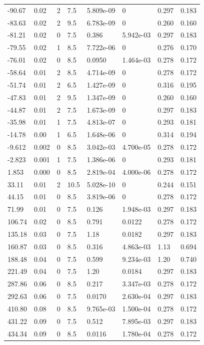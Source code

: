 \documentclass[preview]{standalone}
\begin{document}
{{\begin{tabular}{L{1.2cm}C{1.2cm} C{0.3cm}C{0.5cm} C{1.4cm}C{1.4cm} C{1.4cm}C{1.4cm}}
  -90.67  &  0.02  & 2     & 7.5 &  5.809e-09  & 0  & 0.297 &  0.183   \\ 
  -83.63  &  0.02  & 2     & 9.5 &  6.783e-09  & 0  & 0.260 &  0.160   \\ 
  -81.21  &  0.02  & 0     & 7.5 &  0.386  & 5.942e-03  & 0.297 &  0.183   \\ 
  -79.55  &  0.02  & 1     & 8.5 &  7.722e-06  & 0  & 0.276 &  0.170   \\ 
  -76.01  &  0.02  & 0     & 8.5 &  0.0950  & 1.464e-03  & 0.278 &  0.172   \\ 
  -58.64  &  0.01  & 2     & 8.5 &  4.714e-09  & 0  & 0.278 &  0.172   \\ 
  -51.74  &  0.01  & 2     & 6.5 &  1.427e-09  & 0  & 0.316 &  0.195   \\ 
  -47.83  &  0.01  & 2     & 9.5 &  1.347e-09  & 0  & 0.260 &  0.160   \\ 
  -44.87  &  0.01  & 2     & 7.5 &  1.673e-09  & 0  & 0.297 &  0.183   \\ 
  -35.98  &  0.01  & 1     & 7.5 &  4.813e-07  & 0  & 0.293 &  0.181   \\ 
  -14.78  &  0.00  & 1     & 6.5 &  1.648e-06  & 0  & 0.314 &  0.194   \\ 
  -9.612  &  0.002  & 0     & 8.5 &  3.042e-03  & 4.700e-05  & 0.278 &  0.172   \\ 
  -2.823  &  0.001  & 1     & 7.5 &  1.386e-06  & 0  & 0.293 &  0.181   \\ 
  1.853  &  0.000  & 0     & 8.5 &  2.819e-04  & 4.000e-06  & 0.278 &  0.172   \\ 
  33.11  &  0.01  & 2     & 10.5 &  5.028e-10  & 0  & 0.244 &  0.151   \\ 
  44.15  &  0.01  & 0     & 8.5 &  3.819e-06  & 0  & 0.278 &  0.172   \\ 
  71.99  &  0.01  & 0     & 7.5 &  0.126  & 1.948e-03  & 0.297 &  0.183   \\ 
  106.74  &  0.02  & 0     & 8.5 &  0.791  & 0.0122  & 0.278 &  0.172   \\ 
  135.18  &  0.03  & 0     & 7.5 &  1.18  & 0.0182  & 0.297 &  0.183   \\ 
  160.87  &  0.03  & 0     & 8.5 &  0.316  & 4.863e-03  & 1.13 &  0.694   \\ 
  188.48  &  0.04  & 0     & 7.5 &  0.599  & 9.234e-03  & 1.20 &  0.740   \\ 
  221.49  &  0.04  & 0     & 7.5 &  1.20  & 0.0184  & 0.297 &  0.183   \\ 
  287.86  &  0.06  & 0     & 8.5 &  0.217  & 3.347e-03  & 0.278 &  0.172   \\ 
  292.63  &  0.06  & 0     & 7.5 &  0.0170  & 2.630e-04  & 0.297 &  0.183   \\ 
  410.80  &  0.08  & 0     & 8.5 &  9.765e-03  & 1.500e-04  & 0.278 &  0.172   \\ 
  431.22  &  0.09  & 0     & 7.5 &  0.512  & 7.895e-03  & 0.297 &  0.183   \\ 
  434.34  &  0.09  & 0     & 8.5 &  0.0116  & 1.780e-04  & 0.278 &  0.172   \\ 
\hline 
\end{tabular} 

}}
\end{document}
